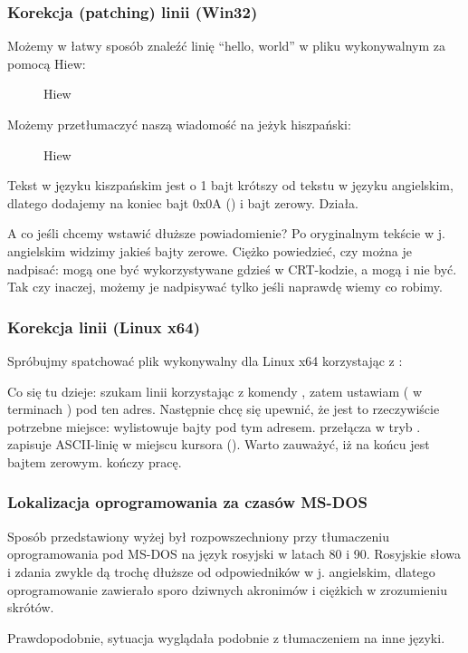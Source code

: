 \subsubsection{Korekcja (patching) linii (Win32)}

Możemy w łatwy sposób znaleźć linię ``hello, world'' w pliku wykonywalnym za pomocą Hiew:

\begin{figure}[H]
\centering
{}
\caption{Hiew}
\label{}
\end{figure}

Możemy przetłumaczyć naszą wiadomość na jeżyk hiszpański:

\begin{figure}[H]
\centering
{}
\caption{Hiew}
\label{}
\end{figure}

Tekst w języku kiszpańskim jest o 1 bajt krótszy od tekstu w języku angielskim, dlatego dodajemy na koniec bajt 0x0A () i bajt zerowy.
Działa.

A co jeśli chcemy wstawić dłuższe powiadomienie?
Po oryginalnym tekście w j. angielskim widzimy jakieś bajty zerowe.
Ciężko powiedzieć, czy można je nadpisać: mogą one być wykorzystywane gdzieś w \ac{CRT}-kodzie, a mogą i nie być.
Tak czy inaczej, możemy je nadpisywać tylko jeśli naprawdę wiemy co robimy.

\subsubsection{Korekcja linii (Linux x64)}

\myindex{\radare}
Spróbujmy spatchować plik wykonywalny dla Linux x64 korzystając z \radare{}:



Co się tu dzieje: szukam linii  korzystając z komendy \TT{/}, 
zatem ustawiam  ( w terminach \radare{}) pod ten adres.
Następnie chcę się upewnić, że jest to rzeczywiście potrzebne miejsce:  wylistowuje bajty pod tym adresem.
 przełącza \radare{} w tryb .
 zapisuje ASCII-linię w miejscu kursora ().
Warto zauważyć, iż  na końcu jest bajtem zerowym.
 kończy pracę.

\subsubsection{Lokalizacja oprogramowania za czasów MS-DOS}

Sposób przedstawiony wyżej był rozpowszechniony przy tłumaczeniu oprogramowania pod MS-DOS na język rosyjski w latach 80 i 90.
Rosyjskie słowa i zdania zwykle dą trochę dłuższe od odpowiedników w j. angielskim, dlatego  oprogramowanie zawierało 
sporo dziwnych akronimów i ciężkich w zrozumieniu skrótów.

Prawdopodobnie, sytuacja wyglądała podobnie z tłumaczeniem na inne języki.


